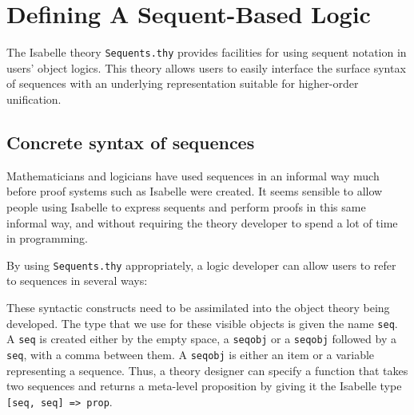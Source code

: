 \chapter{Defining A Sequent-Based Logic}
\label{chap:sequents}

\underscoreon %

The Isabelle theory \texttt{Sequents.thy} provides facilities for using
sequent notation in users' object logics. This theory allows users to
easily interface the surface syntax of sequences with an underlying
representation suitable for higher-order unification.

\section{Concrete syntax of sequences}

Mathematicians and logicians have used sequences in an informal way
much before proof systems such as Isabelle were created. It seems
sensible to allow people using Isabelle to express sequents and
perform proofs in this same informal way, and without requiring the
theory developer to spend a lot of time in \ML{} programming.

By using {\tt Sequents.thy}
appropriately, a logic developer can allow users to refer to sequences
in several ways:
%

These syntactic constructs need to be assimilated into the object
theory being developed. The type that we use for these visible objects
is given the name {\tt seq}.
A {\tt seq} is created either by the empty space, a {\tt seqobj} or a
{\tt seqobj} followed by a {\tt seq}, with a comma between them. A
{\tt seqobj} is either an item or a variable representing a
sequence. Thus, a theory designer can specify a function that takes
two sequences and returns a meta-level proposition by giving it the
Isabelle type \verb|[seq, seq] => prop|.

